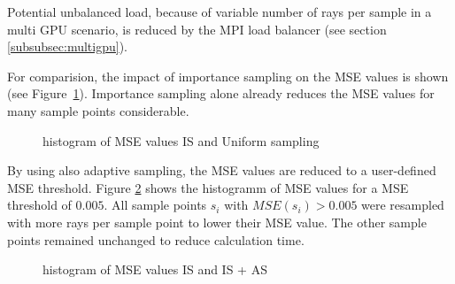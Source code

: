 Potential unbalanced load, because of variable number of rays per sample 
in a multi GPU scenario, is reduced by the MPI load balancer (see section
\ref{subsubsec:multigpu}).

For comparision, the impact of importance sampling
on the MSE values is shown (see Figure~\ref{plot:importance2}). 
Importance sampling alone already reduces the MSE values for
many sample points considerable.
\begin{figure}[H]
  \centerline{
    }
  \caption{histogram of MSE values IS and Uniform sampling}
  \label{plot:importance2}
\end{figure}
By using also adaptive sampling, the MSE values are reduced to a user-defined MSE threshold.
Figure \ref{plot:adaptive} shows the histogramm of MSE values for a MSE threshold
of $0.005$. All sample points $s_i$ with $MSE(s_i) > 0.005$ were resampled with more rays
per sample point to lower their MSE value. The other sample points remained unchanged
to reduce calculation time.
\begin{figure}[H]
  \centerline{
    }
  \caption{histogram of MSE values IS and IS + AS}
  \label{plot:adaptive}
\end{figure}
